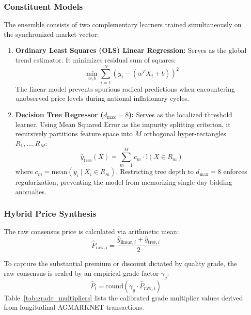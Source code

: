 \documentclass[conference]{IEEEtran}
\begin{document}
\subsubsection{Constituent Models}
The ensemble consists of two complementary learners trained simultaneously on the synchronized market vector:
\begin{enumerate}
    \item \textbf{Ordinary Least Squares (OLS) Linear Regression:} Serves as the global trend estimator. It minimizes residual sum of squares:
    \begin{equation}
    \min_{w, b} \sum_{i=1}^{N} \left( y_i - (w^T X_i + b) \right)^2
    \end{equation}
    The linear model prevents spurious radical predictions when encountering unobserved price levels during national inflationary cycles.
    \item \textbf{Decision Tree Regressor ($d_{\max}=8$):} Serves as the localized threshold learner. Using Mean Squared Error as the impurity splitting criterion, it recursively partitions feature space into $M$ orthogonal hyper-rectangles $R_1, \dots, R_M$:
    \begin{equation}
    \hat{y}_{\text{tree}}(X) = \sum_{m=1}^{M} c_m \cdot \mathbb{I}(X \in R_m)
    \end{equation}
    where $c_m = \text{mean}(y_i \mid X_i \in R_m)$. Restricting tree depth to $d_{\max}=8$ enforces regularization, preventing the model from memorizing single-day bidding anomalies.
\end{enumerate}

\subsubsection{Hybrid Price Synthesis}
The raw consensus price is calculated via arithmetic mean:
\begin{equation}
\hat{P}_{\text{raw}, i} = \frac{\hat{y}_{\text{linear}, i} + \hat{y}_{\text{tree}, i}}{2}
\end{equation}

To capture the substantial premium or discount dictated by quality grade, the raw consensus is scaled by an empirical grade factor $\gamma_g$:
\begin{equation}
\hat{P}_i = \text{round}\left( \gamma_g \cdot \hat{P}_{\text{raw}, i} \right)
\end{equation}
Table~\ref{tab:grade_multipliers} lists the calibrated grade multiplier values derived from longitudinal AGMARKNET transactions.
\end{document}
